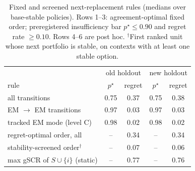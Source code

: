 \begin{table}[!t]
\centering
\caption{Fixed and screened next-replacement rules (medians over base-stable policies). Rows 1--3: agreement-optimal fixed order; preregistered insufficiency bar $p^\star\le0.90$ and regret rate $\ge0.10$. Rows 4--6 are post hoc. $^\dagger$First ranked unit whose next portfolio is stable, on contexts with at least one stable option.}\label{tab:ranking}
\footnotesize
\setlength{\tabcolsep}{3pt}
\begin{tabular}{@{}lcccc@{}}
\toprule
& \multicolumn{2}{c}{old holdout} & \multicolumn{2}{c}{new holdout}\\
rule & $p^\star$ & regret & $p^\star$ & regret \\
\midrule
all transitions & 0.75 & 0.37 & 0.75 & 0.38 \\
EM $\to$ EM transitions & 0.97 & 0.03 & 0.97 & 0.03 \\
tracked EM mode (level C) & 0.98 & 0.02 & 0.98 & 0.02 \\
\midrule
regret-optimal order, all & -- & 0.34 & -- & 0.34 \\
stability-screened order$^\dagger$ & -- & 0.07 & -- & 0.06 \\
max gSCR of $S\cup\{i\}$ (static) & -- & 0.77 & -- & 0.76 \\
\bottomrule
\end{tabular}
\end{table}
